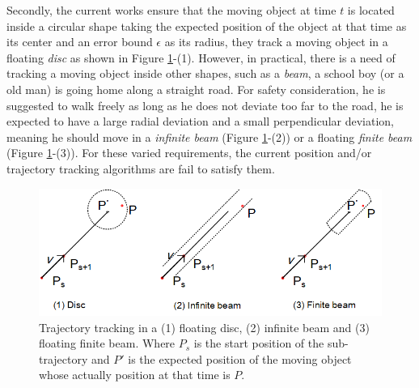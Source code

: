 Secondly, the current works ensure that the moving object at time $t$ is located inside a circular shape taking the expected position of the object at that time as its center and an error bound $\epsilon$ as its radius, \ie they track a moving object in a floating \emph{disc} as shown in Figure \ref{fig:areas}-(1). 
%
However, in practical, there is a need of tracking a moving object inside other shapes, such as a \emph{beam}, \eg a school boy (or a old man) is going home along a straight road. For safety consideration, he is suggested to walk freely as long as he does not deviate too far to the road, \ie he is expected to have a large radial deviation and a small perpendicular deviation, meaning he should move in a \emph{infinite beam} \cite{Chen:Space,Daescu:metric} (Figure \ref{fig:areas}-(2)) or a floating \emph{finite beam} (Figure \ref{fig:areas}-(3)).
For these varied requirements, the current position and/or trajectory tracking algorithms are fail to satisfy them.


\begin{figure}[tb!]
	\centering
	\includegraphics[scale=1.0]{Figures/Fig-Areas.png}\vspace{-1ex}
	\vspace{-1ex}
	\caption{\small  Trajectory tracking in a (1) floating disc, (2) infinite beam and (3) floating finite beam. Where $P_s$ is the start position of the sub-trajectory and $P'$ is the expected position of the moving object whose actually position at that time is $P$.}
	\vspace{-1ex}
	\label{fig:areas}
\end{figure}

